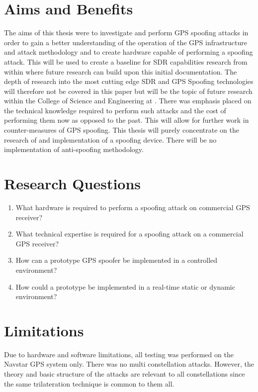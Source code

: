\section{Aims and Benefits}\label{sec:Aims}
The aims of this thesis were to investigate and perform GPS spoofing attacks in order to gain a better understanding of the operation of the GPS infrastructure and attack
methodology and to create hardware capable of performing a spoofing attack. This will be used to create a baseline for SDR capabilities research from within \univname where future research can build upon this initial documentation.
The depth of research into the most cutting edge SDR and GPS Spoofing technologies will therefore not be covered in this paper but will be the topic of future research
within the College of Science and Engineering at \univname.
There was  emphasis placed on the technical knowledge required to perform such attacks and the cost of performing them now as opposed to the past. This will
allow for further work in counter-measures of GPS spoofing.
This thesis will purely concentrate on the research of and implementation of a spoofing device. There will be no implementation of anti-spoofing methodology.

\section{Research Questions}\label{sec:RQs}
\begin{enumerate}
    \item What hardware is required to perform a spoofing attack on commercial GPS receiver?
    \item What technical expertise is required for a spoofing attack on a commercial GPS receiver?
    \item How can a prototype GPS spoofer be implemented in a controlled environment?
    \item How could a prototype be implemented in a real-time static or dynamic environment? 
\end{enumerate}

\section{Limitations}\label{sec:Limits}
Due to hardware and software limitations, all testing was performed on the Navstar GPS system only. There was no multi constellation attacks. However, the theory and basic
structure of the attacks are relevant to all constellations since the same trilateration technique is common to them all.

